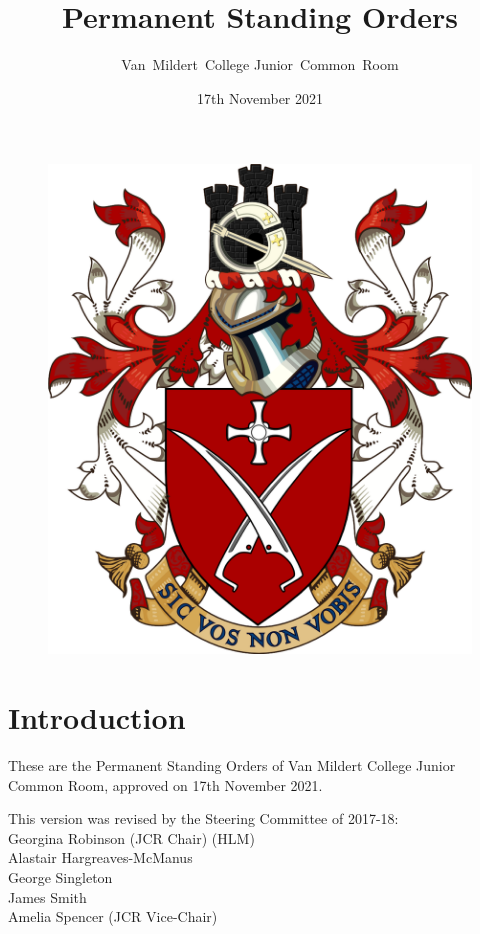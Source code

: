 \documentclass[12pt]{article}
\title{Permanent Standing Orders}
\author{Van~Mildert~College Junior~Common~Room}
\date{17th November 2021}
\begin{document}
\begin{titlepage}  %
    \maketitle
    \begin{figure}[h]
    \includegraphics[scale=0.25]{arms}  %
    \centering
    \end{figure}
    \thispagestyle{empty}
\end{titlepage}

\setcounter{page}{2}  %
\section*{Introduction}
These are the Permanent Standing Orders of Van Mildert College Junior Common Room, approved on 17th November 2021.

This version was revised by the Steering Committee of 2017-18:\\
\hspace*{2cm}Georgina Robinson (JCR Chair) (HLM)\\
\hspace*{2cm}Alastair Hargreaves-McManus\\
\hspace*{2cm}George Singleton\\
\hspace*{2cm}James Smith\\
\hspace*{2cm}Amelia Spencer (JCR Vice-Chair)
\end{document}
